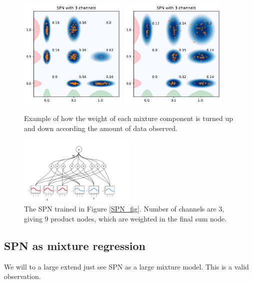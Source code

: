 \begin{figure}[H]
    \centering
    {\includegraphics[width=0.46\textwidth]{Pictures/SPN_illustration3.pdf} }%
    \qquad
   {\includegraphics[width=0.46\textwidth]{Pictures/SPN_illustration4.pdf} }%
    \caption{Example of how the weight of each mixture component is turned up and
    down according the amount of data observed.}
    \label{WeightedSPN}
\end{figure}



\begin{figure}
    \centering
    \includegraphics[width=0.5\textwidth]{Figures/SPN_graph2.pdf}
    \caption{The SPN trained in Figure \ref{SPN_fig}. Number of channels are
    3, giving 9 product nodes, which are weighted in the final sum node.}
\end{figure}


\subsection{SPN as mixture regression}
We will to a large extend just see SPN as a large mixture model. This is a valid observation. 

